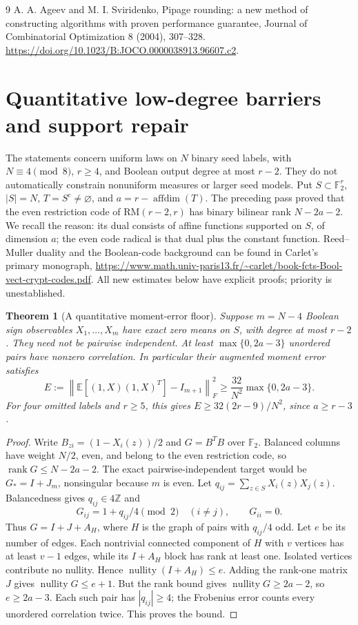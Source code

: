 \documentclass[11pt]{article}
\newtheorem{theorem}{Theorem}[section]
\begin{document}
\begin{thebibliography}{9}
 A. A. Ageev and M. I. Sviridenko, Pipage rounding:
a new method of constructing algorithms with proven performance
guarantee, Journal of Combinatorial Optimization 8 (2004), 307--328.
\url{https://doi.org/10.1023/B:JOCO.0000038913.96607.c2}.
\end{thebibliography}
\section{Quantitative low-degree barriers and support repair}
\label{sec:nonlinear-quantitative}
The statements concern uniform laws on $N$ binary seed labels, with
$N\equiv4\pmod8$, $r\ge4$, and Boolean output degree at most $r-2$.
They do not automatically constrain nonuniform measures or larger seed
models. Put $S\subset\mathbb F_2^r$, $|S|=N$, $T=S^c\ne\varnothing$,
and $a=r-\operatorname{affdim}(T)$. The preceding pass proved that the
even restriction code of $\mathrm{RM}(r-2,r)$ has binary bilinear rank
$N-2a-2$. We recall the reason: its dual consists of affine functions
supported on $S$, of dimension $a$; the even code radical is that dual
plus the constant function. Reed--Muller duality and the Boolean-code
background can be found in Carlet's primary monograph,
\url{https://www.math.univ-paris13.fr/~carlet/book-fcts-Bool-vect-crypt-codes.pdf}.
All new estimates below have explicit proofs; priority is unestablished.

\begin{theorem}[A quantitative moment-error floor]
\label{thm:nonlinear-moment-floor}
Suppose $m=N-4$ Boolean sign observables $X_1,\ldots,X_m$ have exact
zero means on $S$, with degree at most $r-2$. They need not be pairwise
independent. At least $\max\{0,2a-3\}$ unordered pairs have nonzero
correlation. In particular their augmented moment error satisfies
\[
 E:=\left\|\mathbb E[(1,X)(1,X)^T]-I_{m+1}\right\|_F^2
 \ge\frac{32}{N^2}\max\{0,2a-3\}.
\]
For four omitted labels and $r\ge5$, this gives
$E\ge32(2r-9)/N^2$, since $a\ge r-3$.
\end{theorem}
\begin{proof}
Write $B_{zi}=(1-X_i(z))/2$ and $G=B^TB$ over $\mathbb F_2$.
Balanced columns have weight $N/2$, even, and belong to the even
restriction code, so $\operatorname{rank}G\le N-2a-2$.
The exact pairwise-independent target would be $G_*=I+J_m$,
nonsingular because $m$ is even. Let $q_{ij}=\sum_{z\in S}X_i(z)X_j(z)$.
Balancedness gives $q_{ij}\in4\mathbb Z$ and
\[
 G_{ij}=1+q_{ij}/4\pmod2\quad(i\ne j),\qquad G_{ii}=0.
\]
Thus $G=I+J+A_H$, where $H$ is the graph of pairs with $q_{ij}/4$ odd.
Let $e$ be its number of edges. Each nontrivial connected component of
$H$ with $v$ vertices has at least $v-1$ edges, while its $I+A_H$ block
has rank at least one. Isolated vertices contribute no nullity. Hence
$\operatorname{nullity}(I+A_H)\le e$. Adding the rank-one matrix $J$
gives $\operatorname{nullity}G\le e+1$.
But the rank bound gives $\operatorname{nullity}G\ge2a-2$, so
$e\ge2a-3$. Each such pair has $|q_{ij}|\ge4$; the Frobenius error
counts every unordered correlation twice. This proves the bound.
\end{proof}
\end{document}
